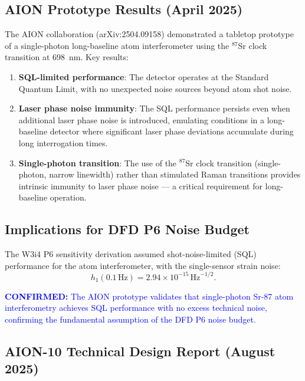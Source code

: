 \documentclass[11pt]{article}
\theoremstyle{definition}
\theoremstyle{remark}
\newcommand{\ee}[1]{\times10^{#1}}
\newcommand{\sqrtHz}{\,\mathrm{Hz}^{-1/2}}
\newcommand{\confirmed}[1]{\textcolor{blue}{\textbf{CONFIRMED:} #1}}
\begin{document}
\subsection{AION Prototype Results (April 2025)}

The AION collaboration (arXiv:2504.09158) demonstrated a tabletop prototype
of a single-photon long-baseline atom interferometer using the ${}^{87}$Sr
clock transition at 698~nm. Key results:

\begin{enumerate}[nosep]
\item \textbf{SQL-limited performance}: The detector operates at the Standard
  Quantum Limit, with no unexpected noise sources beyond atom shot noise.
\item \textbf{Laser phase noise immunity}: The SQL performance persists even
  when additional laser phase noise is introduced, emulating conditions in a
  long-baseline detector where significant laser phase deviations accumulate
  during long interrogation times.
\item \textbf{Single-photon transition}: The use of the ${}^{87}$Sr clock
  transition (single-photon, narrow linewidth) rather than stimulated Raman
  transitions provides intrinsic immunity to laser phase noise --- a critical
  requirement for long-baseline operation.
\end{enumerate}

\subsection{Implications for DFD P6 Noise Budget}

The W3i4 P6 sensitivity derivation assumed shot-noise-limited (SQL)
performance for the atom interferometer, with the single-sensor strain
noise:
\begin{equation}
h_1(0.1\,\mathrm{Hz}) = 2.94\ee{-15}\sqrtHz.
\end{equation}

\confirmed{The AION prototype validates that single-photon Sr-87 atom
interferometry achieves SQL performance with no excess technical noise,
confirming the fundamental assumption of the DFD P6 noise budget.}

\subsection{AION-10 Technical Design Report (August 2025)}
\end{document}
